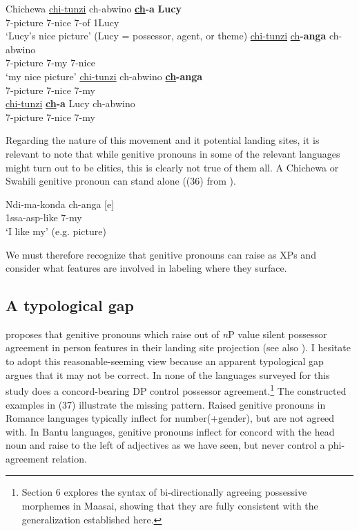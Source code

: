 \documentclass[output=paper
,modfonts
,nonflat]{langsci/langscibook}
\begin{document}
\begin{exe}
	\ex  Chichewa
	\xlist
	\ex
	\gll \underline{chi}\underline{-tunzi}     ch-abwino     \textbf{\underline{ch}-a}   \textbf{Lucy}\\
	7-picture   7-nice         7-of   1Lucy\\
	\glt `Lucy's nice picture'  (Lucy = possessor, agent, or theme) 	
	\ex 
	\gll \underline{chi}\underline{-tunzi}      \underline{ch}\textbf{-anga}     ch-abwino\\
	7-picture   7-my         7-nice\\
	\glt `my nice picture'
	\ex
	\gll  *\underline{chi}\underline{-tunzi}    ch-abwino     \textbf{\underline{ch}-anga}\\
	7-picture   7-nice      7-my\\
	\ex
	\gll  *\underline{chi}\underline{-tunzi}    \textbf{\underline{ch}-a} Lucy     ch-abwino\\
	7-picture   7-nice      7-my\\
	\endxlist
\end{exe}
Regarding the nature of this movement and it potential landing sites, it is relevant to note that while genitive pronouns in some of the relevant languages might turn out to be clitics, this is clearly not true of them all. A Chichewa or Swahili genitive pronoun can stand alone ((36) from \citealt[295]{Carstens1997}).

\begin{exe}
\ex 
\gll Ndi-ma-konda  ch-anga [e]\\
1ssa-asp-like     7-my\\
\glt *`I like my' (e.g. picture)
\end{exe}
We must therefore recognize that genitive pronouns can raise as XPs and consider what features are involved in labeling where they surface. 

\subsection{A typological gap}
\citet{Giusti2008} proposes that genitive pronouns which raise out of \textit{n}P value silent possessor agreement in person features in their landing site projection (see also \citealt{Sichel2002}). I hesitate to adopt this reasonable-seeming view because an apparent typological gap argues that it may not be correct. In none of the languages surveyed for this study does a concord-bearing DP control possessor agreement.\footnote{Section 6 explores the syntax of bi-directionally agreeing possessive morphemes in Maasai, showing that they are fully consistent with the generalization established here.} The constructed examples in (37) illustrate the missing pattern. Raised genitive pronouns in Romance languages typically inflect for number(+gender), but are not agreed with. In Bantu languages, genitive pronouns inflect for concord with the head noun and raise to the left of adjectives as we have seen, but never control a phi-agreement relation. 
\end{document}
